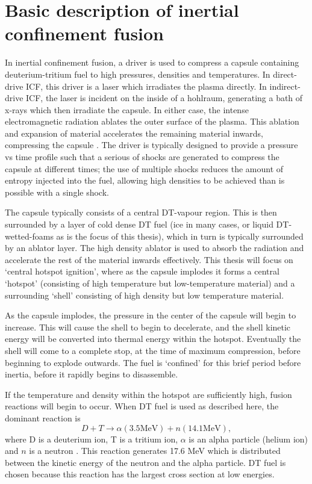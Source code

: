 \section{Basic description of inertial confinement fusion}

In inertial confinement fusion, a driver is used to compress a capsule containing deuterium-tritium fuel to high pressures, densities and temperatures. In direct-drive ICF, this driver is a laser which irradiates the plasma directly. In indirect-drive ICF, the laser is incident on the inside of a hohlraum, generating a bath of x-rays which then irradiate the capsule. In either case, the intense electromagnetic radiation ablates the outer surface of the plasma. This ablation and expansion of material accelerates the remaining material inwards, compressing the capsule \cite{Atzeni2008}. The driver is typically designed to provide a pressure vs time profile such that a serious of shocks are generated to compress the capsule at different times; the use of multiple shocks reduces the amount of entropy injected into the fuel, allowing high densities to be achieved than is possible with a single shock.

The capsule typically consists of a central DT-vapour region. This is then surrounded by a layer of cold dense DT fuel (ice in many cases, or liquid DT-wetted-foams as is the focus of this thesis), which in turn is typically surrounded by an ablator layer. The high density ablator is used to absorb the radiation and accelerate the rest of the material inwards effectively. This thesis will focus on `central hotspot ignition', where as the capsule implodes it forms a central `hotspot' (consisting of high temperature but low-temperature material) and a surrounding `shell' consisting of high density but low temperature material.

As the capsule implodes, the pressure in the center of the capsule will begin to increase. This will cause the shell to begin to decelerate, and the shell kinetic energy will be converted into thermal energy within the hotspot. Eventually the shell will come to a complete stop, at the time of maximum compression, before beginning to explode outwards. The fuel is `confined' for this brief period before inertia, before it rapidly begins to disassemble. 

If the temperature and density within the hotspot are sufficiently high, fusion reactions will begin to occur. When DT fuel is used as described here, the dominant reaction is \begin{equation} D + T \rightarrow \alpha(3.5 \text{MeV}) + n(14.1 \text{MeV}), \end{equation} where D is a deuterium ion, T is a tritium ion, $\alpha$ is an alpha particle (helium ion) and $n$ is a neutron \cite{Atzeni2008}. This reaction generates 17.6 MeV which is distributed between the kinetic energy of the neutron and the alpha particle. DT fuel is chosen because this reaction has the largest cross section at low energies.

